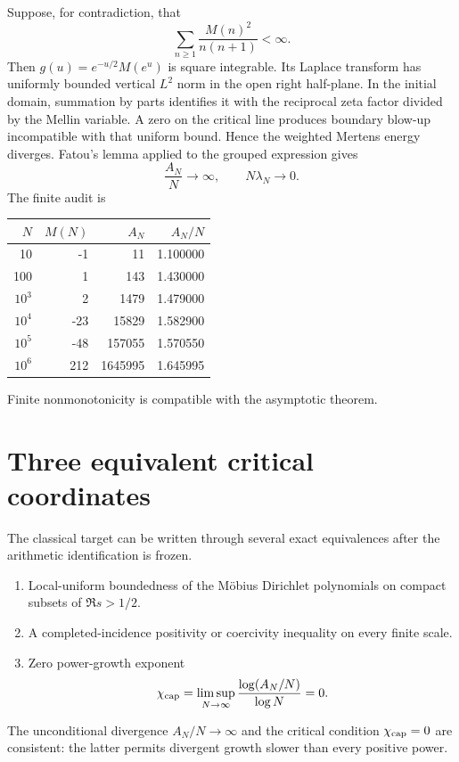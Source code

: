 \documentclass[11pt,a4paper]{article}
\begin{document}
Suppose, for contradiction, that
\begin{equation}
\sum_{n\ge1}\frac{M(n)^2}{n(n+1)}<\infty.
\end{equation}
Then $g(u)=e^{-u/2}M(e^u)$ is square integrable. Its Laplace transform has uniformly bounded vertical $L^2$ norm in the open right half-plane. In the initial domain, summation by parts identifies it with the reciprocal zeta factor divided by the Mellin variable. A zero on the critical line produces boundary blow-up incompatible with that uniform bound. Hence the weighted Mertens energy diverges. Fatou's lemma applied to the grouped expression gives
\begin{equation}
\frac{A_N}{N}\longrightarrow\infty,
\qquad N\lambda_N\longrightarrow0.
\end{equation}
The finite audit is
\begin{center}
\begin{tabular}{rrrr}
\toprule
$N$&$M(N)$&$A_N$&$A_N/N$\\\midrule
10&-1&11&1.100000\\
100&1&143&1.430000\\
$10^3$&2&1479&1.479000\\
$10^4$&-23&15829&1.582900\\
$10^5$&-48&157055&1.570550\\
$10^6$&212&1645995&1.645995\\
\bottomrule
\end{tabular}
\end{center}
Finite nonmonotonicity is compatible with the asymptotic theorem.

\section{Three equivalent critical coordinates}
The classical target can be written through several exact equivalences after the arithmetic identification is frozen.
\begin{enumerate}
\item Local-uniform boundedness of the M\"obius Dirichlet polynomials on compact subsets of $\Re s>1/2$.
\item A completed-incidence positivity or coercivity inequality on every finite scale.
\item Zero power-growth exponent
\begin{equation}
\chi_{\rm cap}=\limsup_{N\to\infty}\frac{\log(A_N/N)}{\log N}=0.
\end{equation}
\end{enumerate}
The unconditional divergence $A_N/N\to\infty$ and the critical condition $\chi_{\rm cap}=0$ are consistent: the latter permits divergent growth slower than every positive power.
\end{document}

